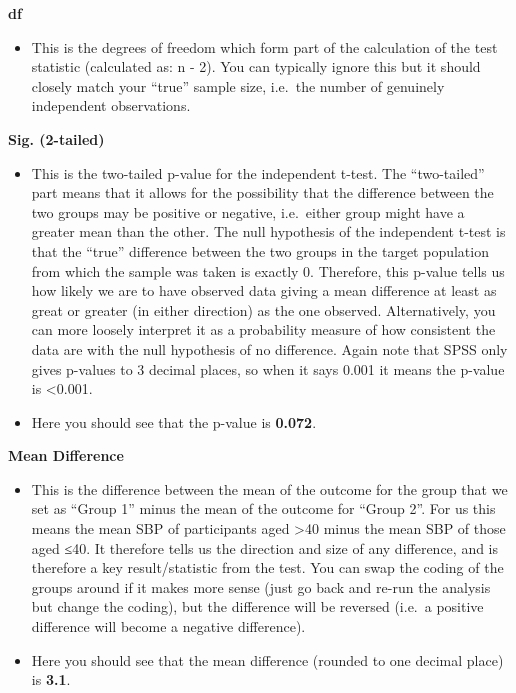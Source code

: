 \documentclass[
]{book}
\providecommand{\tightlist}{%
  \setlength{\itemsep}{0pt}\setlength{\parskip}{0pt}}
\begin{document}
\textbf{df}

\begin{itemize}
\tightlist
\item
  This is the degrees of freedom which form part of the calculation of the test statistic (calculated as: n - 2). You can typically ignore this but it should closely match your ``true'' sample size, i.e.~the number of genuinely independent observations.
\end{itemize}

\textbf{Sig. (2-tailed)}

\begin{itemize}
\item
  This is the two-tailed p-value for the independent t-test. The ``two-tailed'' part means that it allows for the possibility that the difference between the two groups may be positive or negative, i.e.~either group might have a greater mean than the other. The null hypothesis of the independent t-test is that the ``true'' difference between the two groups in the target population from which the sample was taken is exactly 0. Therefore, this p-value tells us how likely we are to have observed data giving a mean difference at least as great or greater (in either direction) as the one observed. Alternatively, you can more loosely interpret it as a probability measure of how consistent the data are with the null hypothesis of no difference. Again note that SPSS only gives p-values to 3 decimal places, so when it says 0.001 it means the p-value is \textless0.001.
\item
  Here you should see that the p-value is \textbf{0.072}.
\end{itemize}

\textbf{Mean Difference}

\begin{itemize}
\item
  This is the difference between the mean of the outcome for the group that we set as ``Group 1'' minus the mean of the outcome for ``Group 2''. For us this means the mean SBP of participants aged \textgreater40 minus the mean SBP of those aged ≤40. It therefore tells us the direction and size of any difference, and is therefore a key result/statistic from the test. You can swap the coding of the groups around if it makes more sense (just go back and re-run the analysis but change the coding), but the difference will be reversed (i.e.~a positive difference will become a negative difference).
\item
  Here you should see that the mean difference (rounded to one decimal place) is \textbf{3.1}.
\end{itemize}
\end{document}

